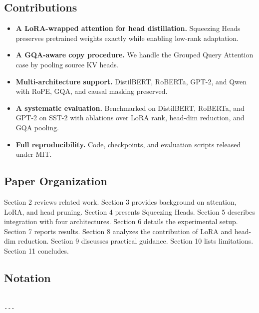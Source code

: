 \subsection{Contributions}

\begin{itemize}
\item \textbf{A LoRA-wrapped attention for head distillation.} Squeezing Heads
  preserves pretrained weights exactly while enabling low-rank adaptation.
\item \textbf{A GQA-aware copy procedure.} We handle the Grouped Query Attention
  case by pooling source KV heads.
\item \textbf{Multi-architecture support.} DistilBERT, RoBERTa, GPT-2, and Qwen with
  RoPE, GQA, and causal masking preserved.
\item \textbf{A systematic evaluation.} Benchmarked on DistilBERT, RoBERTa, and GPT-2
  on SST-2 with ablations over LoRA rank, head-dim reduction, and GQA
  pooling.
\item \textbf{Full reproducibility.} Code, checkpoints, and evaluation scripts
  released under MIT.

\end{itemize}
\subsection{Paper Organization}

Section 2 reviews related work. Section 3 provides background on attention, 
LoRA, and head pruning. Section 4 presents Squeezing Heads. Section 5 
describes integration with four architectures. Section 6 details the 
experimental setup. Section 7 reports results. Section 8 analyzes the 
contribution of LoRA and head-dim reduction. Section 9 discusses practical 
guidance. Section 10 lists limitations. Section 11 concludes.



\subsection{Notation}

\begin{lstlisting}

---
\end{lstlisting}
